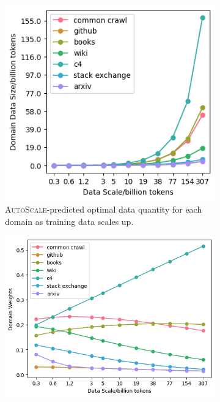 \documentclass{article} %
\begin{document}
\begin{appendices}{}
\begin{figure}[h!]\vspace{-0.5em}
    \centering
    \begin{subfigure}[b]{0.42\textwidth}
        \includegraphics[width=\textwidth]{gptfigs/gptdata.png}
        \caption{\textsc{AutoScale}-predicted optimal data quantity for each domain as training data scales up.}
    \end{subfigure}
    \hspace{1em}
    \begin{subfigure}[b]{0.51\textwidth}
        \includegraphics[width=\textwidth]{gptfigs/gptdmw.png}

\end{subfigure}
\end{figure}
\end{appendices}
\end{document}
